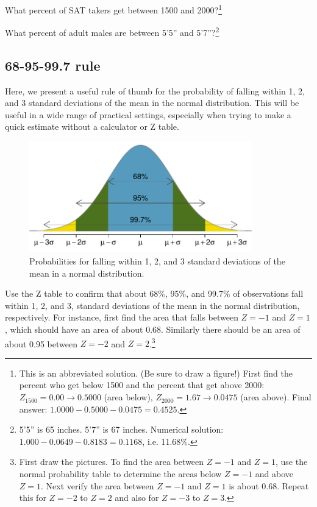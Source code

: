\begin{exercise}
What percent of SAT takers get between 1500 and 2000?\footnote{This is an abbreviated solution. (Be sure to draw a figure!) First find the percent who get below 1500 and the percent that get above 2000: $Z_{1500} = 0.00 \to 0.5000$ (area below), $Z_{2000} = 1.67 \to 0.0475$ (area above). Final answer: $1.0000-0.5000 - 0.0475 = 0.4525$.}
\end{exercise}

\begin{exercise}
What percent of adult males are between 5'5'' and 5'7''?\footnote{5'5'' is 65 inches. 5'7'' is 67 inches. Numerical solution: $1.000 - 0.0649 - 0.8183 = 0.1168$, i.e. 11.68\%.}
\end{exercise}


\subsection{68-95-99.7 rule}

Here, we present a useful rule of thumb for the probability of falling within 1, 2, and 3 standard deviations of the mean in the normal distribution. This will be useful in a wide range of practical settings, especially when trying to make a quick estimate without a calculator or Z table.

\begin{figure}[hht]
\centering
\includegraphics[height=1.9in]{02/figures/6895997/6895997}
\caption{Probabilities for falling within 1, 2, and 3 standard deviations of the mean in a normal distribution.}
\label{6895997}
\end{figure}

\begin{exercise}
Use the Z table to confirm that about 68\%, 95\%, and 99.7\% of observations fall within 1, 2, and 3, standard deviations of the mean in the normal distribution, respectively. For instance, first find the area that falls between $Z=-1$ and $Z=1$, which should have an area of about 0.68. Similarly there should be an area of about 0.95 between $Z=-2$ and $Z=2$.\footnote{First draw the pictures. To find the area between $Z=-1$ and $Z=1$, use the normal probability table to determine the areas below $Z=-1$ and above $Z=1$. Next verify the area between $Z=-1$ and $Z=1$ is about 0.68. Repeat this for $Z=-2$ to $Z=2$ and also for $Z=-3$ to $Z=3$.}
\end{exercise}

